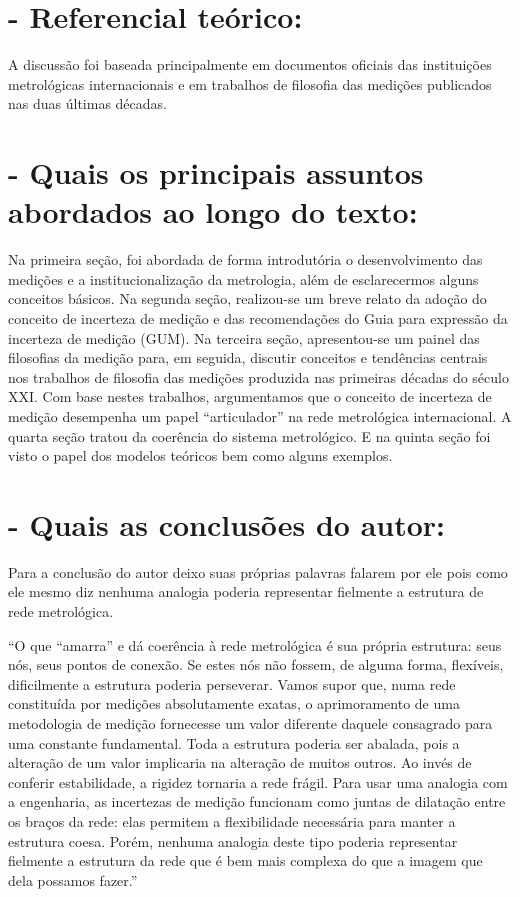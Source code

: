 \documentclass [a4paper, 12pt]{article}
\begin{document}
\section*{- Referencial teórico:}

A discussão foi baseada principalmente em documentos oficiais das instituições metrológicas internacionais e em trabalhos de filosofia das medições publicados nas duas últimas décadas.

\section*{- Quais os principais assuntos abordados ao longo do texto:}

Na primeira seção, foi abordada de forma introdutória o desenvolvimento das medições e a institucionalização da metrologia, além de esclarecermos alguns conceitos básicos. Na segunda seção, realizou-se um breve relato da adoção do conceito de incerteza de medição e das recomendações do Guia para expressão da incerteza de medição (GUM). Na terceira seção, apresentou-se um painel das filosofias da medição para, em seguida, discutir conceitos e tendências centrais nos trabalhos de filosofia das medições produzida nas primeiras décadas do século XXI. Com base nestes trabalhos, argumentamos que o conceito de incerteza de medição desempenha um papel “articulador” na rede metrológica internacional. A quarta seção tratou da coerência do sistema metrológico. E na quinta seção foi visto o papel dos modelos teóricos bem como alguns exemplos. 

\section*{- Quais as conclusões do autor:}

Para a conclusão do autor deixo suas próprias palavras falarem por ele pois como ele mesmo diz nenhuma analogia poderia representar fielmente a estrutura de rede metrológica.

“O que “amarra” e dá coerência à rede metrológica é sua própria estrutura: seus nós, seus pontos de conexão. Se estes nós não fossem, de alguma forma, flexíveis, dificilmente a estrutura poderia perseverar. Vamos supor que, numa rede constituída por medições absolutamente exatas, o aprimoramento de uma metodologia de medição fornecesse um valor diferente daquele consagrado para uma constante fundamental. Toda a estrutura poderia ser abalada, pois a alteração de um valor implicaria na alteração de muitos outros. Ao invés de conferir estabilidade, a rigidez tornaria a rede frágil. Para usar uma analogia com a engenharia, as incertezas de medição funcionam como juntas de dilatação entre os braços da rede: elas permitem a flexibilidade necessária para manter a estrutura coesa. Porém, nenhuma analogia deste tipo poderia representar fielmente a estrutura da rede que é bem mais complexa do que a imagem que dela possamos fazer.”
\end{document}

